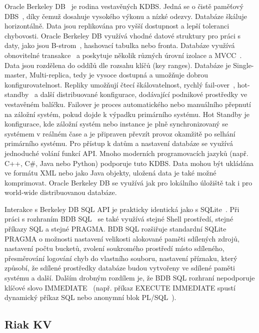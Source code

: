 \documentclass[czech,master,dept460,male,csharp,cpdeclaration]{diploma}
\begin{document}
	Oracle Berkeley DB~\cite{berkeleydb} je rodina vestavěných KDBS. Jedná se o čistě paměťový DBS~\cite{inmemory}, díky čemuž dosahuje vysokého výkonu a nízké odezvy. Databáze škáluje horizontálně. Data jsou replikována pro vyšší dostupnost a lepší toleranci chybovosti. Oracle Berkeley DB využívá vhodné datové struktury pro práci s daty, jako jsou B-strom~\cite{btree}, hashovací tabulka nebo fronta. Databáze využívá obnovitelné transakce~\cite{acid} a poskytuje několik různých úrovní izolace a MVCC~\cite{mvcc}. Data jsou rozdělena do oddílů dle rozsahu klíčů (key ranges). Databáze je Single-master, Multi-replica, tedy je vysoce dostupná a umožňuje dobrou konfigurovatelnost. Repliky umožňují čtecí škálovatelnost, rychlý fail-over~\cite{failover}, hot-standby~\cite{hotstandby} a další distribuované konfigurace, dodávající podnikové prostředky ve vestavěném balíčku. Failover je proces automatického nebo manuálního přepnutí na záložní systém, pokud dojde k výpadku primárního systému. Hot Standby je konfigurace, kde záložní systém nebo instance je plně synchronizovaný se systémem v reálném čase a je připraven převzít provoz okamžitě po selhání primárního systému. Pro přístup k datům a nastavení databáze se využívá jednoduché volání funkcí API. Mnoho moderních programovacích jazyků (např. C++, C\#, Java nebo Python) podporuje tuto KDBS. Data mohou být ukládána ve formátu XML nebo jako Java objekty, uložená data je také možné komprimovat. Oracle Berkeley DB se využívá jak pro lokálního úložiště tak i pro world-wide distribuovanou databáze.
	
	Interakce s Berkeley DB SQL API je prakticky identická jako s SQLite~\cite{sqlite}. Při práci s rozhraním BDB SQL~\cite{bdbsql} se také využívá stejné Shell prostředí, stejné příkazy SQL a stejné PRAGMA. BDB SQL rozšiřuje standardní SQLite PRAGMA o možnosti nastavení velikosti alokované paměti sdílených zdrojů, nastavení počtu bucketů, zvolení soukromého prostředí místo sdíleného, přesměrování logování chyb do vlastního souboru, nastavení příznaku, který způsobí, že sdílené prostředky databáze budou vytvořeny ve sdílené paměti systému a další. Dalším drobným rozdílem je, že BDB SQL rozhraní nepodporuje klíčové slovo IMMEDIATE~\cite{oracle-immediate} (např. příkaz EXECUTE IMMEDIATE spustí dynamický příkaz SQL nebo anonymní blok PL/SQL~\cite{pl-sql}).
	
	\subsection{Riak KV} \label{lab-riak}
	
\end{document}
